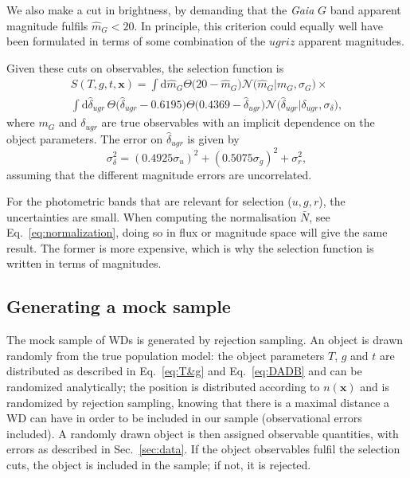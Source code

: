 \documentclass[fleqn,usenatbib]{mnras}
\newcommand{\Teff}{T}
\newcommand{\logg}{g}
\newcommand{\de}{\text{d}}
\begin{document}
We also make a cut in brightness, by demanding that the \emph{Gaia} $G$ band apparent magnitude fulfils $\hat{m}_G < 20$. In principle, this criterion could equally well have been formulated in terms of some combination of the $ugriz$ apparent magnitudes.

Given these cuts on observables, the selection function is
\begin{equation}\label{eq:selection}
\begin{split}
	S(\Teff,\logg,t,\mathbf{x}) = 
    	      \int \de \hat{m}_G \Theta \big( 20-\hat{m}_G \big)\mathcal{N}\big( \hat{m}_G | m_G,\sigma_G \big) \times \\
    \int \de \hat{\delta}_{ugr}\,
    \Theta \big( \hat{\delta}_{ugr} -0.6195 \big)
    \Theta \big( 0.4369 - \hat{\delta}_{ugr} \big)
    \mathcal{N}\big( \hat{\delta}_{ugr} | \delta_{ugr},\sigma_{\delta}\big),
\end{split}
\end{equation}
where $m_G$ and $\delta_{ugr}$ are true observables with an implicit dependence on the object parameters. The error on $\hat{\delta}_{ugr}$ is given by
\begin{equation}
	\sigma_\delta^2 = (0.4925 \sigma_u)^2 + (0.5075 \sigma_g)^2 + \sigma_r^2,
\end{equation}
assuming that the different magnitude errors are uncorrelated.

For the photometric bands that are relevant for selection ($u,g,r$), the uncertainties are small. When computing the normalisation $\bar{N}$, see Eq.~\eqref{eq:normalization}, doing so in flux or magnitude space will give the same result. The former is more expensive, which is why the selection function is written in terms of magnitudes.


\subsection{Generating a mock sample}

The mock sample of WDs is generated by rejection sampling. An object is drawn randomly from the true population model: the object parameters $\Teff$, $\logg$ and $t$ are distributed as described in Eq.~\eqref{eq:T&g} and Eq.~\eqref{eq:DADB} and can be randomized analytically; the position is distributed according to $n(\mathbf{x})$ and is randomized by rejection sampling, knowing that there is a maximal distance a WD can have in order to be included in our sample (observational errors included). A randomly drawn object is then assigned observable quantities, with errors as described in Sec.~\ref{sec:data}. If the object observables fulfil the selection cuts, the object is included in the sample; if not, it is rejected.
\end{document}
